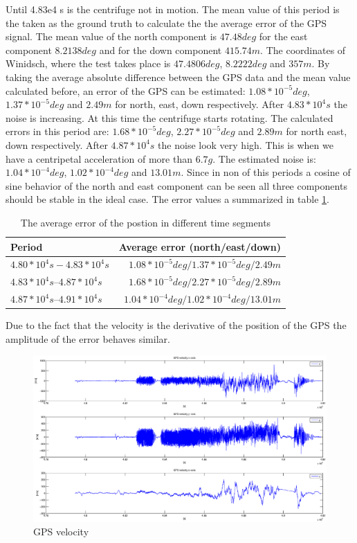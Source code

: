 Until 4.83e4 s is the centrifuge not in motion. The mean value of this period is the taken as the ground truth to calculate the the average error of the GPS signal. The mean value of the north component is $47.48 deg$ for the east component $8.2138 deg$ and for the down component $415.74 m$. The coordinates of Winidsch, where the test takes place is $47.4806 deg$, $8.2222 deg$ and $357 m$. By taking the average absolute difference between the GPS data and the mean value calculated before, an error of the GPS can be estimated: $1.08*10^{-5} deg$, $1.37*10^{-5}deg$ and $2.49 m$ for north, east, down respectively. After $4.83*10^{4} s$ the noise is increasing. At this time the centrifuge starts rotating. The calculated  errors in this period are: $1.68*10^{-5} deg$, $2.27*10^{-5} deg$ and $2.89 m$ for north east, down respectively. After $4.87*10^{4} s$ the noise look very high. This is when we have  a centripetal acceleration of more than  $6.7 g$. The estimated noise is: $1.04*10^{-4} deg$, $1.02*10^{-4} deg$ and $13.01 m$. Since in non of this periods a cosine of sine behavior of the north and east component can be seen all three components should be stable in the ideal case. The error values a summarized in table \ref{ct_pos_error}.
\begin{table}[h]
\centering
\begin{tabular}{|l|r|}
\hline
Period & Average error (north/east/down) \\
\hline
$4.80*10^{4} s - 4.83*10^{4} s$&$1.08*10^{-5} deg / 1.37*10^{-5} deg / 2.49 m$\\
\hline
$4.83*10^{4} s – 4.87*10^{4} s$&$1.68*10^{-5} deg / 2.27*10^{-5} deg / 2.89 m$\\
\hline
$4.87*10^{4} s – 4.91*10^{4} s$&$1.04*10^{-4} deg/ 1.02*10^{-4} deg / 13.01 m$\\
\hline
\end{tabular}
\caption{The average error of the postion in different time segments}
\label{ct_pos_error}
\end{table}
Due to the fact that the velocity is the derivative of the position of the GPS the amplitude of the error behaves  similar.
\begin{figure}[h]
\includegraphics[width=1.2\textwidth]{pictures/ct_vel.eps}
\caption{GPS velocity}
\label{ct_vel}
\end{figure}
